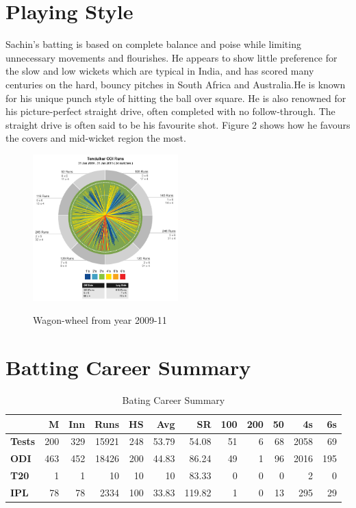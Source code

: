 \documentclass{article}
\begin{document}
\section{Playing Style}
Sachin's batting is based on complete balance and poise while limiting unnecessary  movements and flourishes. He appears to show little preference for the slow and low wickets which are typical in India, and has scored many centuries on the hard, bouncy pitches in South Africa and Australia.He is known for his unique  punch style of hitting the ball over  square. He is also renowned for his picture-perfect  straight  drive, often completed with no follow-through. The straight drive is often said to be his favourite shot.
Figure 2 shows how he favours the covers and mid-wicket region the most. \\
\newpage
\begin{figure}[h!]
\begin{center}
\includegraphics[width=0.5\textwidth]{chart.jpg}
\label{fig:chart}
\caption{Wagon-wheel from year 2009-11} 
\end{center}
\end{figure}


\section{Batting Career Summary}
\begin{table}[h!]
\begin{center}
\begin{tabular}{l r r r r r r r r r r r}
\hline
& {\bf M} & {\bf Inn} & {\bf Runs} & {\bf HS} & {\bf Avg} & {\bf SR} & {\bf 100} & {\bf 200} & {\bf 50} & {\bf 4s} & {\bf 6s} \\
\hline
{\bf Tests} & 200 & 329 & 15921 & 248 & 53.79 & 54.08 & 51 & 6 & 68 & 2058 & 69 \\
{\bf ODI} & 463 & 452 &18426&200 & 44.83 & 86.24 & 49 & 1 & 96 & 2016 & 195 \\
{\bf T20} & 1 & 1 & 10 & 10 & 10 & 83.33 & 0 &0 & 0 & 2 & 0 \\
{\bf IPL} & 78 & 78 & 2334 & 100 & 33.83 & 119.82 & 1 & 0 & 13 & 295 & 29 \\
\hline
\end{tabular}
\caption{Bating Career Summary \cite{cric} }
\end{center}
\end{table}
\end{document}

